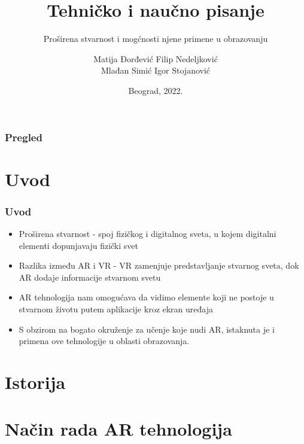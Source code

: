\documentclass[9pt]{beamer}
\title{Tehničko i naučno pisanje}
\subtitle{Proširena stvarnost i mogćnosti njene primene u obrazovanju}
\author{Matija Đorđević  Filip Nedeljković\\
Mlađan Simić  Igor Stojanović}
\institute{Matematički fakultet\\Univerzitet u Beogradu}
\date{
	\footnotesize{Beograd, 2022.}	
}
\begin{document}
\begin{frame}
	\thispagestyle{empty}
	\titlepage
\end{frame}

\addtocounter{framenumber}{-1}







\begin{frame}
	\frametitle{Pregled} %
	\tableofcontents[hidesubsections] 
\end{frame}

\section{Uvod}

\begin{frame}[fragile]\frametitle{Uvod}
	\begin{itemize}	
 \setlength\itemsep{1.5em}
		\item Proširena stvarnost - spoj fizičkog i digitalnog sveta, u kojem digitalni elementi dopunjavaju fizički svet
		\item Razlika između AR i VR - VR zamenjuje predstavljanje stvarnog sveta, dok AR dodaje informacije stvarnom svetu
		\item AR tehnologija nam omogućava da vidimo elemente koji ne postoje u stvarnom životu putem aplikacije kroz ekran uređaja
		\item S obzirom na bogato okruženje za učenje koje nudi AR, istaknuta je i primena ove tehnologije u oblasti obrazovanja.
	
	\end{itemize}
\end{frame}





\section{Istorija}
	\begin{frame}

		
	\end{frame}
\section{Način rada AR tehnologija}
	\begin{frame}

	\end{frame}
\end{document}

